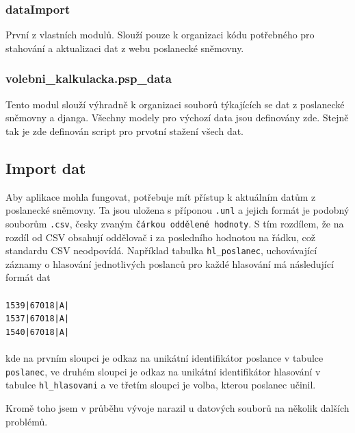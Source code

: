 \subsubsection{dataImport}
První z vlastních modulů. Slouží pouze k organizaci kódu potřebného pro stahování a aktualizaci dat z webu poslanecké sněmovny. 

\subsubsection{volebni\_kalkulacka.psp\_data}
Tento modul slouží výhradně k organizaci souborů týkajících se dat z poslanecké sněmovny a djanga. Všechny modely pro výchozí data jsou definovány zde. Stejně tak je zde definován script pro prvotní stažení všech dat.


\subsection{Import dat}
\label{import_dat}
Aby aplikace mohla fungovat, potřebuje mít přístup k aktuálním datům z poslanecké sněmovny. Ta jsou uložena s příponou \texttt{.unl} a jejich formát je podobný souborům \texttt{.csv}, česky zvaným \texttt{čárkou oddělené hodnoty}. S tím rozdílem, že na rozdíl od CSV obsahují oddělovač i za posledního hodnotou na řádku, což standardu CSV neodpovídá\cite{RFC4180}. Například tabulka \texttt{hl\_poslanec}, uchovávající záznamy o hlasování jednotlivých poslanců pro každé hlasování má následující formát dat\\
\\
\texttt{1539|67018|A|\\
1537|67018|A|\\
1540|67018|A|}\\
\\
kde na prvním sloupci je odkaz na unikátní identifikátor poslance v tabulce \texttt{poslanec}, ve druhém sloupci je odkaz na unikátní identifikátor hlasování v tabulce \texttt{hl\_hlasovani} a ve třetím sloupci je volba, kterou poslanec učinil. 

\par Kromě toho jsem v průběhu vývoje narazil u datových souborů na několik dalších problémů.

